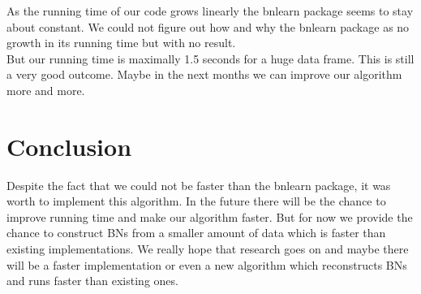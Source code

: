 
	As the running time of our code grows linearly the bnlearn package seems to stay about constant. We could not figure out how and why the bnlearn package as no growth in its running time but with no result.\\
	But our running time is maximally 1.5 seconds for a huge data frame. This is still a very good outcome. Maybe in the next months we can improve our algorithm more and more.



\chapter{Conclusion}

	Despite the fact that we could not be faster than the bnlearn package, it was worth to implement this algorithm. In the future there will be the chance to improve running time and make our algorithm faster. But for now we provide the chance to construct BNs from a smaller amount of data which is faster than existing implementations. We really hope that research goes on and maybe there will be a faster implementation or even a new algorithm which reconstructs BNs and runs faster than existing ones.


